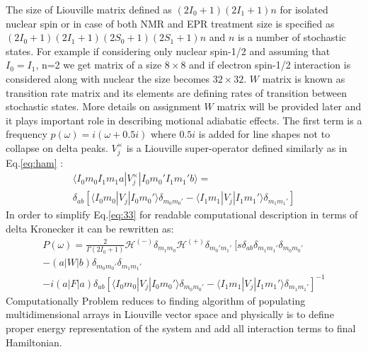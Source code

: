 The size of Liouville matrix defined as $(2I_0+1)(2I_1+1)n$ for isolated nuclear spin or in case of both NMR and EPR treatment size is specified as $(2I_0+1)(2I_1+1)(2S_0+1)(2S_1+1)n$
and $n$ is a number of stochastic states. For example if considering only nuclear spin-1/2 and  assuming that $I_0=I_1$, n=2 we get matrix of a size $8\times 8$ and if electron spin-1/2 interaction is considered along with nuclear the size becomes $32\times 32$. $W$ matrix is known as transition rate matrix and its elements are defining rates of transition between stochastic states. More details on assignment $W$ matrix will be provided later and it plays important role in describing motional adiabatic effects. The first term is a frequency $p(\omega)=i(\omega+0.5i)$ where $0.5i$ is added for line shapes not to collapse on delta peaks. $V^{\times}_j$ is a Liouville super-operator defined similarly as in Eq.\ref{eq:ham} : 
\begin{multline}\label{eq:36}
\langle I_0m_0I_1m_1a|V^{\times}_j|I_0m_0'I_1m_1'b\rangle= \\
\delta_{ab}[\langle I_0m_0|V_j|I_0m_0'\rangle \delta_{m_0m_ 0'}-\langle I_1m_1|V_j|I_1m_1'\rangle \delta_{m_1m_1'}]
\end{multline}
In order to simplify Eq.\ref{eq:33} for readable computational description  in terms of delta Kronecker it can be rewritten as: 
\begin{multline}\label{eq:37}
P(\omega)=
\frac{2}{\Gamma(2I_0+1)}\mathcal{H}^{(-)}\delta_{m_1m_0}\mathcal{H}^{(+)}\delta_{m_0'm_1'} \ [s\delta_{ab}\delta_{m_1m_1'}\delta_{m_0m_0'} \\-(a|W|b)\delta_{m_0m_0'}\delta_{m_1m_1'} \\ -i(a|F|a)\delta_{ab}[\langle I_0m_0|V_j|I_0m_0'\rangle \delta_{m_0m_ 0'}-\langle I_1m_1|V_j|I_1m_1'\rangle \delta_{m_1m_1'}]^{-1}
\end{multline}   
Computationally Problem reduces to finding algorithm of populating multidimensional arrays in Liouville vector space and physically is to define proper energy representation of the system and add all interaction terms to final Hamiltonian.     
\clearpage 